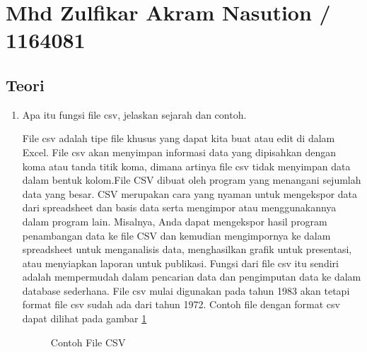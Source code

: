 \section{Mhd Zulfikar Akram Nasution / 1164081}
\subsection{Teori}

\begin{enumerate}

\item Apa itu fungsi file csv, jelaskan sejarah dan contoh.
\par
	 File csv adalah tipe file khusus yang dapat kita buat atau edit di dalam Excel. File csv akan menyimpan informasi data yang dipisahkan dengan koma atau tanda titik koma, dimana artinya file csv tidak menyimpan data dalam bentuk kolom.File CSV dibuat oleh program yang menangani sejumlah data yang besar. CSV merupakan cara yang nyaman untuk mengekspor data dari spreadsheet dan basis data serta mengimpor atau menggunakannya dalam program lain. Misalnya, Anda dapat mengekspor hasil program penambangan data ke file CSV dan kemudian mengimpornya ke dalam spreadsheet untuk menganalisis data, menghasilkan grafik untuk presentasi, atau menyiapkan laporan untuk publikasi. Fungsi dari file csv itu sendiri adalah mempermudah dalam pencarian data dan pengimputan data ke dalam database sederhana. File csv mulai digunakan pada tahun 1983 akan tetapi format file csv sudah ada dari tahun 1972. Contoh file dengan format csv dapat dilihat pada gambar \ref{4_1}


	\begin{figure}[ht]
		\caption{Contoh File CSV}
		\label{4_1}
	\end{figure}


\end{enumerate}

